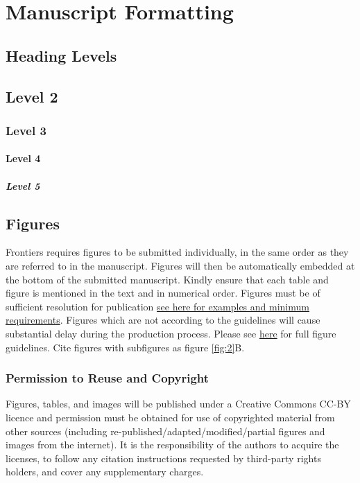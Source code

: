 \documentclass[utf8]{frontiersSCNS} %
\begin{document}
\section{Manuscript Formatting}

\subsection{Heading Levels}


\subsection{Level 2}
\subsubsection{Level 3}
\paragraph{Level 4}
\subparagraph{Level 5}


\subsection{Figures}
Frontiers requires figures to be submitted individually, in the same order as they are referred to in the manuscript. Figures will then be automatically embedded at the bottom of the submitted manuscript. Kindly ensure that each table and figure is mentioned in the text and in numerical order. Figures must be of sufficient resolution for publication \href{http://home.frontiersin.org/about/author-guidelines#ResolutionRequirements}{see here for examples and minimum requirements}. Figures which are not according to the guidelines will cause substantial delay during the production process. Please see \href{http://home.frontiersin.org/about/author-guidelines#GeneralStyleGuidelinesforFigures}{here} for full figure guidelines. Cite figures with subfigures as figure \ref{fig:2}B.


\subsubsection{Permission to Reuse and Copyright}
Figures, tables, and images will be published under a Creative Commons CC-BY licence and permission must be obtained for use of copyrighted material from other sources (including re-published/adapted/modified/partial figures and images from the internet). It is the responsibility of the authors to acquire the licenses, to follow any citation instructions requested by third-party rights holders, and cover any supplementary charges.
\end{document}

